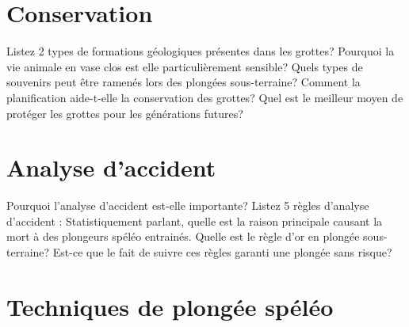 \documentclass[english,1pt,a4paper]{article}
\begin{document}
	\section{Conservation}

	\begin{outline}
		\1 Listez 2 types de formations géologiques présentes dans les grottes?	\vspace{2cm}
		\1 Pourquoi la vie animale en vase clos est elle particulièrement sensible?	\vspace{2cm}
		\1 Quels types de souvenirs peut être ramenés lors des plongées sous-terraine?	\vspace{2cm}
		\1 Comment la planification aide-t-elle la conservation des grottes?	\vspace{2cm}
		\1 Quel est le meilleur moyen de protéger les grottes pour les générations futures?	\vspace{2cm}
	\end{outline}
	\pagebreak	

	\section{Analyse d'accident}

	\begin{outline}
		\1 Pourquoi l’analyse d’accident est-elle importante?	\vspace{2cm}
		\1 Listez 5 règles d’analyse d’accident :	\vspace{2cm}
		\1 Statistiquement parlant, quelle est la raison principale causant la mort à des plongeurs spéléo entrainés.	\vspace{2cm}
		\1 Quelle est le règle d’or en plongée sous-terraine?	\vspace{2cm}
		\1 Est-ce que le fait de suivre ces règles garanti une plongée sans risque?	\vspace{2cm}
	\end{outline}
	\pagebreak	

	\section{Techniques de plongée spéléo}
\end{document}

